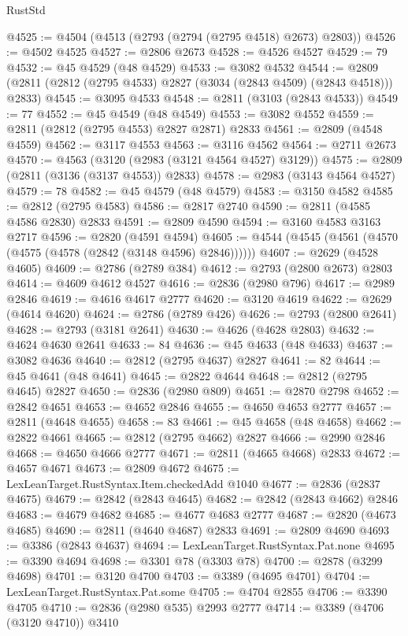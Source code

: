 \begin{lexlean}{RustStd}
\begin{coremodule}
{\begin{coremodule}
{{{{{{{{{{{{{{{{{{{{{{{{{{{{{{{{{@4525 := @4504 (@4513 (@2793 (@2794 (@2795 @4518) @2673) @2803))
@4526 := @4502 @4525
@4527 := @2806 @2673
@4528 := @4526 @4527
@4529 := 79
@4532 := @45 @4529 (@48 @4529)
@4533 := @3082 @4532
@4544 := @2809 (@2811 (@2812 (@2795 @4533) @2827 (@3034 (@2843 @4509) (@2843 @4518))) @2833)
@4545 := @3095 @4533
@4548 := @2811 (@3103 (@2843 @4533))
@4549 := 77
@4552 := @45 @4549 (@48 @4549)
@4553 := @3082 @4552
@4559 := @2811 (@2812 (@2795 @4553) @2827 @2871) @2833
@4561 := @2809 (@4548 @4559)
@4562 := @3117 @4553
@4563 := @3116 @4562
@4564 := @2711 @2673
@4570 := @4563 (@3120 (@2983 (@3121 @4564 @4527) @3129))
@4575 := @2809 (@2811 (@3136 (@3137 @4553)) @2833)
@4578 := @2983 (@3143 @4564 @4527)
@4579 := 78
@4582 := @45 @4579 (@48 @4579)
@4583 := @3150 @4582
@4585 := @2812 (@2795 @4583)
@4586 := @2817 @2740
@4590 := @2811 (@4585 @4586 @2830) @2833
@4591 := @2809 @4590
@4594 := @3160 @4583 @3163 @2717
@4596 := @2820 (@4591 @4594)
@4605 := @4544 (@4545 (@4561 (@4570 (@4575 (@4578 (@2842 (@3148 @4596) @2846))))))
@4607 := @2629 (@4528 @4605)
@4609 := @2786 (@2789 @384)
@4612 := @2793 (@2800 @2673) @2803
@4614 := @4609 @4612 @4527
@4616 := @2836 (@2980 @796)
@4617 := @2989 @2846
@4619 := @4616 @4617 @2777
@4620 := @3120 @4619
@4622 := @2629 (@4614 @4620)
@4624 := @2786 (@2789 @426)
@4626 := @2793 (@2800 @2641)
@4628 := @2793 (@3181 @2641)
@4630 := @4626 (@4628 @2803)
@4632 := @4624 @4630 @2641
@4633 := 84
@4636 := @45 @4633 (@48 @4633)
@4637 := @3082 @4636
@4640 := @2812 (@2795 @4637) @2827
@4641 := 82
@4644 := @45 @4641 (@48 @4641)
@4645 := @2822 @4644
@4648 := @2812 (@2795 @4645) @2827
@4650 := @2836 (@2980 @809)
@4651 := @2870 @2798
@4652 := @2842 @4651
@4653 := @4652 @2846
@4655 := @4650 @4653 @2777
@4657 := @2811 (@4648 @4655)
@4658 := 83
@4661 := @45 @4658 (@48 @4658)
@4662 := @2822 @4661
@4665 := @2812 (@2795 @4662) @2827
@4666 := @2990 @2846
@4668 := @4650 @4666 @2777
@4671 := @2811 (@4665 @4668) @2833
@4672 := @4657 @4671
@4673 := @2809 @4672
@4675 := LexLeanTarget.RustSyntax.Item.checkedAdd @1040
@4677 := @2836 (@2837 @4675)
@4679 := @2842 (@2843 @4645)
@4682 := @2842 (@2843 @4662) @2846
@4683 := @4679 @4682
@4685 := @4677 @4683 @2777
@4687 := @2820 (@4673 @4685)
@4690 := @2811 (@4640 @4687) @2833
@4691 := @2809 @4690
@4693 := @3386 (@2843 @4637)
@4694 := LexLeanTarget.RustSyntax.Pat.none
@4695 := @3390 @4694
@4698 := @3301 @78 (@3303 @78)
@4700 := @2878 (@3299 @4698)
@4701 := @3120 @4700
@4703 := @3389 (@4695 @4701)
@4704 := LexLeanTarget.RustSyntax.Pat.some
@4705 := @4704 @2855
@4706 := @3390 @4705
@4710 := @2836 (@2980 @535) @2993 @2777
@4714 := @3389 (@4706 (@3120 @4710)) @3410
}}}}}}}}}}}}}}}}}}}}}}}}}}}}}}}}}
\end{coremodule}}
\end{coremodule}
\end{lexlean}
